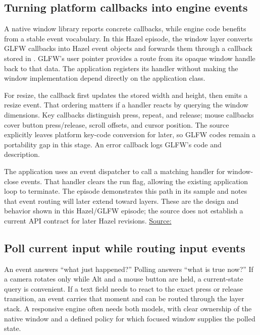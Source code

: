 \subsection{Turning platform callbacks into engine events}\label{05-engine-i-ch013-turning-platform-callbacks-into-engine-events}

\hypertarget{05-engine-i-ch013-turning-platform-callbacks-into-engine-events}{}

A native window library reports concrete callbacks, while engine code benefits from a stable event vocabulary. In this Hazel episode, the window layer converts GLFW callbacks into Hazel event objects and forwards them through a callback stored in . GLFW's user pointer provides a route from its opaque window handle back to that data. The application registers its handler without making the window implementation depend directly on the application class.

For resize, the callback first updates the stored width and height, then emits a resize event. That ordering matters if a handler reacts by querying the window dimensions. Key callbacks distinguish press, repeat, and release; mouse callbacks cover button press/release, scroll offsets, and cursor position. The source explicitly leaves platform key-code conversion for later, so GLFW codes remain a portability gap in this stage. An error callback logs GLFW's code and description.

The application uses an event dispatcher to call a matching handler for window-close events. That handler clears the run flag, allowing the existing application loop to terminate. The episode demonstrates this path in its sample and notes that event routing will later extend toward layers. These are the design and behavior shown in this Hazel/GLFW episode; the source does not establish a current API contract for later Hazel revisions. \href{https://www.youtube.com/watch?v=r74WxFMIEdU}{Source:}

\subsection{Poll current input while routing input events}\label{05-engine-i-ch013-poll-current-input-while-routing-input-events}

\hypertarget{05-engine-i-ch013-poll-current-input-while-routing-input-events}{}

An event answers ``what just happened?'' Polling answers ``what is true now?'' If a camera rotates only while Alt and a mouse button are held, a current-state query is convenient. If a text field needs to react to the exact press or release transition, an event carries that moment and can be routed through the layer stack. A responsive engine often needs both models, with clear ownership of the native window and a defined policy for which focused window supplies the polled state.

